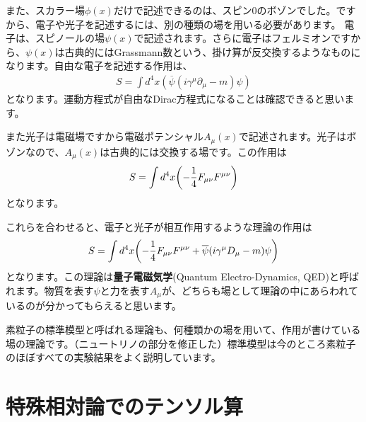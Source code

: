 \documentclass[report,paper=a4, fontsize=12pt, line_length=16cm, number_of_lines=33,dvipdfmx]{jlreq}
\numberwithin{equation}{chapter}
\newcommand{\del}{\partial}
\newcommand{\strong}[1]{{\sffamily \bfseries #1}}
\newcommand{\psib}{\overline{\psi}}
\begin{document}
また、スカラー場$\phi(x)$だけで記述できるのは、スピン0のボゾンでした。ですから、電子や光子を記述するには、別の種類の場を用いる必要があります。
電子は、スピノールの場$\psi(x)$で記述されます。さらに電子はフェルミオンですから、$\psi(x)$は古典的にはGrassmann数という、掛け算が反交換するようなものになります。自由な電子を記述する作用は、
\begin{align}
  S=\int d^4x(\psib(i\gamma^{\mu}\del_{\mu}-m)\psi)
\end{align}
となります。運動方程式が自由なDirac方程式になることは確認できると思います。

また光子は電磁場ですから電磁ポテンシャル$A_{\mu}(x)$で記述されます。光子はボゾンなので、$A_{\mu}(x)$は古典的には交換する場です。この作用は
\begin{align}
  S=\int d^4x \qty(
    -\frac14 F_{\mu\nu}F^{\mu\nu}
  )
\end{align}
となります。

これらを合わせると、電子と光子が相互作用するような理論の作用は
\begin{align}
  S=\int d^4x\qty(
    -\frac14 F_{\mu\nu}F^{\mu\nu}+
    \psib(i\gamma^{\mu}D_{\mu}-m)\psi
  )
\end{align}
となります。この理論は\strong{量子電磁気学}(Quantum Electro-Dynamics, QED)と呼ばれます。物質を表す$\psi$と力を表す$A_{\mu}$が、どちらも場として理論の中にあらわれているのが分かってもらえると思います。

素粒子の標準模型と呼ばれる理論も、何種類かの場を用いて、作用が書けている場の理論です。（ニュートリノの部分を修正した）標準模型は今のところ素粒子のほぼすべての実験結果をよく説明しています。


\appendix
\chapter{特殊相対論でのテンソル算}
\label{app:tensor}
\end{document}
